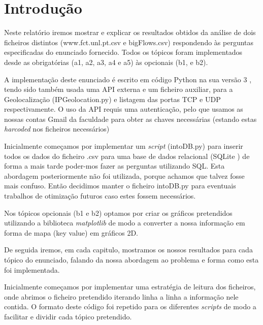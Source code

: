 \chapter{Introdução}

Neste relatório iremos mostrar e explicar os resultados obtidos da análise de dois ficheiros distintos (www.fct.unl.pt.csv e bigFlows.csv) respondendo às perguntas especificadas do enunciado fornecido. Todos os tópicos foram implementados desde as obrigatórias (a1, a2, a3, a4 e a5) às opcionais (b1, e b2).

A implementação deste enunciado é escrito em código Python na sua versão 3 \cite{PYTHON3}, tendo sido também usada uma API externa e um ficheiro auxiliar, para a Geolocalização \cite{API} (IPGeolocation.py) e listagem das portas TCP e UDP \cite{PORTS} respectivamente. O uso da API requis uma autenticação, pelo que usamos as nossas contas Gmail da faculdade para obter as chaves necessárias (estando estas \textit{
harcoded} nos ficheiros necessários)

Inicialmente começamos por implementar um \textit{script} (intoDB.py) para inserir todos os dados do ficheiro .csv para uma base de dados relacional (SQLite \cite{SQLite}) de forma a mais tarde poder-mos fazer as perguntas utilizando SQL. Esta abordagem posteriormente não foi utilizada, porque achamos que talvez fosse mais confuso. Então decidimos manter o ficheiro intoDB.py para eventuais trabalhos de otimização futuros caso estes fossem necessários.

Nos tópicos opcionais (b1 e b2) optamos por criar os gráficos pretendidos utilizando a biblioteca \textit{matplotlib} \cite{MAT} de modo a converter a nossa informação em forma de mapa (key value) em gráficos 2D.

De seguida iremos, em cada capitulo, mostramos os nossos resultados para cada tópico do enunciado, falando da nossa abordagem ao problema e forma como esta foi implementada.

Inicialmente começamos por implementar uma estratégia de leitura dos ficheiros, onde abrimos o ficheiro pretendido iterando linha a linha a informação nele contida. O formato deste código foi repetido para os diferentes \textit{scripts} de modo a facilitar e dividir cada tópico pretendido.

\clearpage

